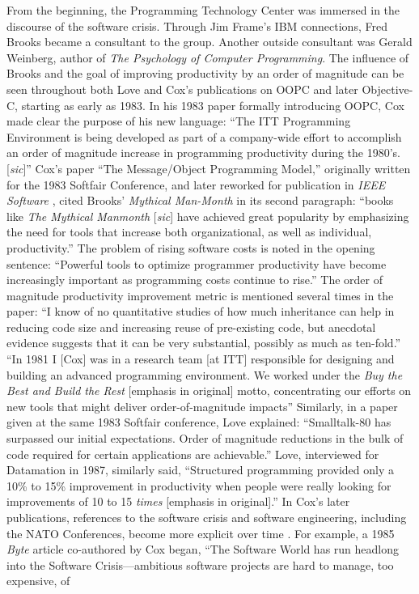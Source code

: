 \documentclass[acmsmall,screen]{acmart}
\begin{document}
From the beginning, the Programming Technology Center was immersed in the discourse of the software crisis. Through Jim Frame's IBM connections, Fred Brooks became a consultant to the group. Another outside consultant was Gerald Weinberg, author of \emph{The Psychology of Computer Programming}. The influence of Brooks and the goal of improving productivity by an order of magnitude can be seen throughout both Love and Cox's publications on OOPC and later Objective-C, starting as early as 1983. In his 1983 paper formally introducing OOPC, Cox made clear the purpose of his new language: ``The ITT Programming Environment is being developed as part of a company-wide effort to accomplish an order of magnitude increase in programming productivity during the 1980's. [\emph{sic}]'' \citep[15]{cox_object_1983} Cox's paper ``The Message/Object Programming Model,'' originally written for the 1983 Softfair Conference, and later reworked for publication in \emph{IEEE Software} \citetext{\citealp[51]{cox_message/object_1983}; \citealp[50]{cox_message/object_1984}}, cited Brooks' \emph{Mythical Man-Month} \citep{brooks_mythical_1975} in its second paragraph: ``books like \emph{The Mythical Manmonth} [\emph{sic}] have achieved great popularity by emphasizing the need for tools that increase both organizational, as well as individual, productivity.'' The problem of rising software costs is noted in the opening sentence: ``Powerful tools to optimize programmer productivity have become increasingly important as programming costs continue to rise.''  The order of magnitude productivity improvement metric is mentioned several times in the paper: ``I know of no quantitative studies of how much inheritance can help in reducing code size and increasing reuse of pre-existing code, but anecdotal evidence suggests that it can be very substantial, possibly as much as ten-fold.'' \citep[56]{cox_message/object_1983} ``In 1981 I [Cox] was in a research team [at ITT] responsible for designing and building an advanced programming environment. We worked under the \emph{Buy the Best and Build the Rest} [emphasis in original] motto, concentrating our efforts on new tools that might deliver order-of-magnitude impacts\textellipsis'' \citep[57]{cox_message/object_1983} Similarly, in a paper given at the same 1983 Softfair conference, Love explained: ``Smalltalk-80 has surpassed our initial expectations. Order of magnitude reductions in the bulk of code required for certain applications are achievable.'' \citep[61]{love_experiences_1983} Love, interviewed for Datamation in 1987, similarly said, ``Structured programming\textellipsis{} provided only a 10\% to 15\% improvement in productivity when people were really looking for improvements of 10 to 15 \emph{times} [emphasis in original].'' \citep{verity_oops_1987} In Cox's later publications, references to the software crisis and software engineering, including the NATO Conferences, become more explicit over time \citetext{\citealp[3]{cox_object-oriented_1986};  \citealp[25]{cox_planning_1990}; \citealp[209]{cox_there_1990}; \citealp[iii--iv, 3]{cox_object-oriented_1991}}. For example, a 1985 \emph{Byte} article co-authored by Cox began, ``The Software World has run headlong into the Software Crisis---ambitious software projects are hard to manage, too expensive, of 
\end{document}
